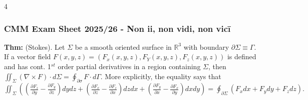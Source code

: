 \documentclass[landscape, 8pt]{extarticle}
\begin{document}
	
	
	\fontsize{5pt}{5pt} \selectfont
	
	\setlength\tabcolsep{4.5pt}
	\setlength\extrarowheight{2pt}
	
	
	\setlength{\abovedisplayskip}{0pt}
	\setlength{\belowdisplayskip}{0pt}
	\setlength{\abovedisplayshortskip}{0pt}
	\setlength{\belowdisplayshortskip}{0pt}
	
	
	\begin{multicols*}{4}
	\raggedcolumns
	\vspace*{-14pt}
	\subsubsection*{CMM Exam Sheet 2025/26 - Non ii, non vidi, non vicī}
	\vspace{-6pt}
		
		\textbf{Thm:} (Stokes). Let $\Sigma$ be a smooth oriented surface in $\mathbb{R}^3$ with boundary $\partial\Sigma \equiv \Gamma$. If a vector field $F(x,y,z) = (F_x(x,y,z), F_Y(x,y,z), F_z(x,y,z))$ is defined and has cont. 1$^{st}$ order partial derivatives in a region containing $\Sigma$, then
		$
		\iint_\Sigma (\nabla \times F)\cdot d\Sigma = \oint_{\partial\sigma} F\cdot d\Gamma.
		$
		More explicitly, the equality says that
		$
		\iint_\Sigma\!\!\left(\!\left(\frac{\partial F_z}{\partial y}-\frac{\partial F_y}{\partial z}\right)dydz + \left(\frac{\partial F_x}{\partial z}-\frac{\partial F_z}{\partial x}\right)dzdx + \left(\frac{\partial F_y}{\partial x}-\frac{\partial F_x}{\partial y}\right)dxdy\right)
		= \oint_{\partial\Sigma}\!\!\left(F_xdx + F_ydy + F_zdz\right).
		$
		

\end{multicols*}
\end{document}
